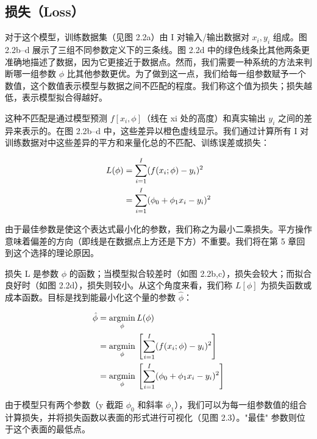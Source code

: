 \documentclass[lang=cn,newtx,10pt,scheme=chinese]{elegantbook}
\begin{document}
\subsection{损失（Loss）}

对于这个模型，训练数据集（见图 2.2a）由 I 对输入/输出数据对 ${x_i, y_i}$ 组成。图 2.2b–d 展示了三组不同参数定义下的三条线。图 2.2d 中的绿色线条比其他两条更准确地描述了数据，因为它更接近于数据点。然而，我们需要一种系统的方法来判断哪一组参数 $\phi$ 比其他参数更优。为了做到这一点，我们给每一组参数赋予一个数值，这个数值表示模型与数据之间不匹配的程度。我们称这个值为损失；损失越低，表示模型拟合得越好。

这种不匹配是通过模型预测 $f[x_i,\phi]$（线在 xi 处的高度）和真实输出 $y_i$ 之间的差异来表示的。在图 2.2b–d 中，这些差异以橙色虚线显示。我们通过计算所有 I 对训练数据对中这些差异的平方和来量化总的不匹配、训练误差或损失：

\begin{align}
	L(\phi) &= \sum_{i=1}^{I} (f(x_i; \phi) - y_i)^2  \notag \\
	&= \sum_{i=1}^{I} (\phi_0 + \phi_1 x_i - y_i)^2 
\end{align}


由于最佳参数是使这个表达式最小化的参数，我们称之为最小二乘损失。平方操作意味着偏差的方向（即线是在数据点上方还是下方）不重要。我们将在第 5 章回到这个选择的理论原因。

损失 L 是参数 $\phi$ 的函数；当模型拟合较差时（如图 2.2b,c），损失会较大；而拟合良好时（如图 2.2d），损失则较小。从这个角度来看，我们称 $L[\phi]$ 为损失函数或成本函数。目标是找到能最小化这个量的参数 $\hat \phi$：


\begin{align}
	\hat{\phi} &= \underset{\phi}{\mathrm{argmin}} \, L(\phi) \notag \\ 
	&= \underset{\phi}{\mathrm{argmin}} \, \left[ \sum_{i=1}^{I} (f(x_i; \phi) - y_i)^2 \right] \notag \\ 
	&= \underset{\phi}{\mathrm{argmin}} \, \left[ \sum_{i=1}^{I} (\phi_0 + \phi_1 x_i - y_i)^2 \right]  
\end{align} 


由于模型只有两个参数（y 截距 $\phi_0$ 和斜率 $\phi_1$），我们可以为每一组参数值的组合计算损失，并将损失函数以表面的形式进行可视化（见图 2.3）。"最佳" 参数则位于这个表面的最低点。
\end{document}
